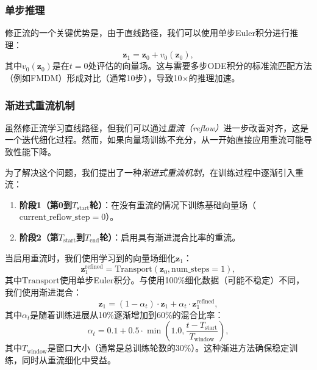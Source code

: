 \documentclass[sigconf]{acmart}
\begin{document}
\subsubsection{\textbf{单步推理}}
修正流的一个关键优势是，由于直线路径，我们可以使用单步Euler积分进行推理：
\begin{equation}
\label{single_step}
\mathbf z_1 = \mathbf z_0 + v_0(\mathbf z_0),
\end{equation}
其中$v_0(\mathbf z_0)$是在$t=0$处评估的向量场。这与需要多步ODE积分的标准流匹配方法（例如FMDM）形成对比（通常10步），导致10$\times$的推理加速。

\subsubsection{\textbf{渐进式重流机制}}
虽然修正流学习直线路径，但我们可以通过\textit{重流（reflow）}\cite{lipman2023rectified}进一步改善对齐，这是一个迭代细化过程。然而，如果向量场训练不充分，从一开始直接应用重流可能导致性能下降。

为了解决这个问题，我们提出了一种\textit{渐进式重流机制}，在训练过程中逐渐引入重流：
\begin{enumerate}[leftmargin=*]
\item \textbf{阶段1（第0到$T_{\text{start}}$轮）}：在没有重流的情况下训练基础向量场（$\text{current\_reflow\_step} = 0$）。
\item \textbf{阶段2（第$T_{\text{start}}$到$T_{\text{end}}$轮）}：启用具有渐进混合比率的重流。
\end{enumerate}

当启用重流时，我们使用学习到的向量场细化$\mathbf z_1$：
\begin{equation}
\label{reflow_refine}
\mathbf z_1^{\text{refined}} = \text{Transport}(\mathbf z_0, \text{num\_steps}=1),
\end{equation}
其中$\text{Transport}$使用单步Euler积分。与使用100\%细化数据（可能不稳定）不同，我们使用渐进混合：
\begin{equation}
\label{progressive_mixing}
\mathbf z_1 = (1 - \alpha_t) \cdot \mathbf z_1 + \alpha_t \cdot \mathbf z_1^{\text{refined}},
\end{equation}
其中$\alpha_t$是随着训练进展从10\%逐渐增加到60\%的混合比率：
\begin{equation}
\label{mixing_ratio}
\alpha_t = 0.1 + 0.5 \cdot \min\left(1.0, \frac{t - T_{\text{start}}}{T_{\text{window}}}\right),
\end{equation}
其中$T_{\text{window}}$是窗口大小（通常是总训练轮数的30\%）。这种渐进方法确保稳定训练，同时从重流细化中受益。
\end{document}
